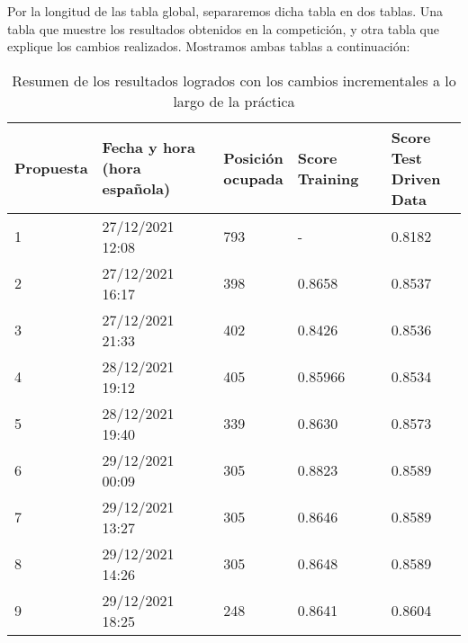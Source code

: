 \documentclass[11pt]{article}
\begin{document}
Por la longitud de las tabla global, separaremos dicha tabla en dos tablas. Una tabla que muestre los resultados obtenidos en la competición, y otra tabla que explique los cambios realizados. Mostramos ambas tablas a continuación:

\begin{table}[H]
\begin{center}
    \begin{tabular}{|p{0.1\linewidth} | p{0.35\linewidth} | p{0.1\linewidth}| p{0.25\linewidth}| p{0.2\linewidth}|}
        \hline
        Propuesta & Fecha y hora (hora española) & Posición ocupada & Score Training & Score Test Driven Data \\

        \hline
        1 & 27/12/2021 12:08 & 793 & - & 0.8182 \\ \hline
        2 & 27/12/2021 16:17 & 398 & 0.8658 & 0.8537 \\ \hline
        3 & 27/12/2021 21:33 & 402 & 0.8426 & 0.8536 \\ \hline
        4 & 28/12/2021 19:12 & 405 & 0.85966 & 0.8534 \\ \hline
        5 & 28/12/2021 19:40 & 339 & 0.8630 & 0.8573 \\ \hline
        6 & 29/12/2021 00:09 & 305 & 0.8823 & 0.8589 \\ \hline
        7 & 29/12/2021 13:27 & 305 & 0.8646 & 0.8589 \\ \hline
        8 & 29/12/2021 14:26 & 305 & 0.8648 & 0.8589 \\ \hline
        9 & 29/12/2021 18:25 & 248 & 0.8641 & 0.8604 \\ \hline
    \end{tabular}
\end{center}
    \caption{Resumen de los resultados logrados con los cambios incrementales a lo largo de la práctica}
\end{table}
\end{document}
